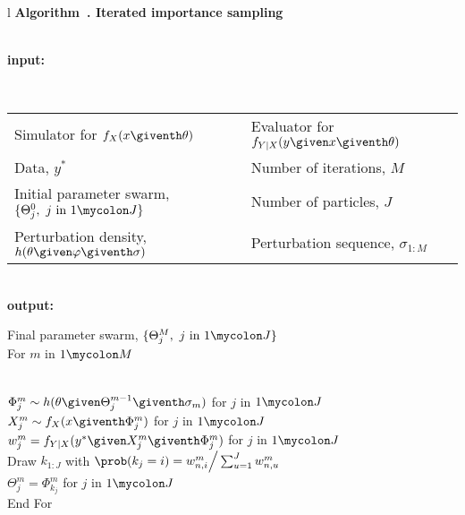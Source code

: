 
\noindent\begin{tabular}{l}
\hline
{\bf Algorithm~{\IIS}. Iterated importance sampling}\rule[-1.5mm]{0mm}{6mm}\\
\hline
{\bf input:}\rule[-1.5mm]{0mm}{6mm} \\
\begin{tabular}{ll}
Simulator for $f_{X}(x\giventh\theta)$ &
Evaluator for $f_{Y|X}(y\given x\giventh\theta)$\\
Data, $y^*$ &
Number of iterations, $M$ \\
Initial parameter swarm, $\{\Theta^0_j, \mbox{ $j$ in $1\mycolon J$}\}$ &
Number of particles, $J$ \\
Perturbation density, $h(\theta\given\varphi\giventh\sigma)$&
Perturbation sequence, $\sigma_{1:M}$ 
\end{tabular}\\
{\bf output:}\rule[-1.5mm]{0mm}{6mm} 
Final parameter swarm, $\{\Theta^M_j, \mbox{ $j$ in $1\mycolon J$}\}$ \\
For $m$ in $1\mycolon M$\rule[0mm]{0mm}{5mm}\\
\asp     $\Phi^{m}_{j}\sim h(\theta\given\Theta^{m-1}_{j}\giventh \sigma_m)$ for $j$ in $1\mycolon J$\\
\asp     $X_{j}^{m}\sim f_{X}(x\giventh \Phi^{m}_{j})$ for $j$ in $1\mycolon J$\\
\asp  $w_{j}^m = f_{Y|X}(y^*\given X_{j}^{m}\giventh \Phi^{m}_{j})$ for $j$ in $1\mycolon J$ \\
\asp  Draw $k_{1:J}$ with $\prob(k_j=i)=  w_{n,i}^m\Big/\sum_{u=1}^J w_{n,u}^m$  \\
\asp  $\Theta^{m}_{j}=\Phi^{m}_{k_j}$ for $j$ in $1\mycolon J$  \\
End For\\
\hline
\end{tabular}
